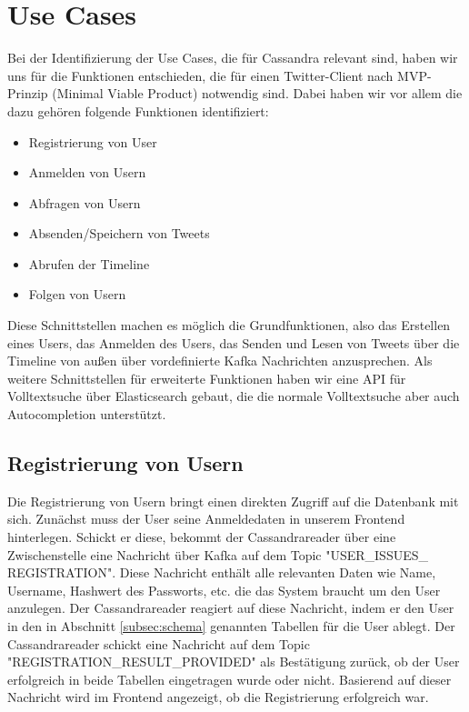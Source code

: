 \section{Use Cases}
\label{sec:usecase}
Bei der Identifizierung der Use Cases, die für Cassandra relevant sind, haben wir uns für die Funktionen entschieden, die für einen Twitter-Client nach MVP-Prinzip (Minimal Viable Product) notwendig sind. Dabei haben wir vor allem die dazu gehören folgende Funktionen identifiziert:
\begin{itemize}
	\item Registrierung von User
	\item Anmelden von Usern
	\item Abfragen von Usern
	\item Absenden/Speichern von Tweets
	\item Abrufen der Timeline
	\item Folgen von Usern
\end{itemize}
Diese Schnittstellen machen es möglich die Grundfunktionen, also das Erstellen eines Users, das Anmelden des Users, das Senden und Lesen von Tweets über die Timeline von außen über vordefinierte Kafka Nachrichten anzusprechen.
Als weitere Schnittstellen für erweiterte Funktionen haben wir eine API für Volltextsuche über Elasticsearch gebaut, die die normale Volltextsuche aber auch Autocompletion unterstützt.\\

\subsection{Registrierung von Usern}
Die Registrierung von Usern bringt einen direkten Zugriff auf die Datenbank mit sich. Zunächst muss der User seine Anmeldedaten in unserem Frontend hinterlegen. Schickt er diese, bekommt der Cassandrareader über eine Zwischenstelle eine Nachricht über Kafka auf dem Topic "USER\_ISSUES\_ REGISTRATION". Diese Nachricht enthält alle relevanten Daten wie Name, Username, Hashwert des Passworts, etc. die das System braucht um den User anzulegen. Der Cassandrareader reagiert auf diese Nachricht, indem er den User in den in Abschnitt \ref{subsec:schema} genannten Tabellen für die User ablegt. Der Cassandrareader schickt eine Nachricht auf dem Topic "REGISTRATION\_RESULT\_PROVIDED" als Bestätigung zurück, ob der User erfolgreich in beide Tabellen eingetragen wurde oder nicht. Basierend auf dieser Nachricht wird im Frontend angezeigt, ob die Registrierung erfolgreich war.

